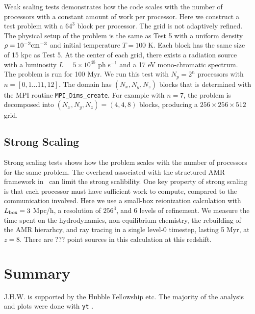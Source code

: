 \documentclass[12pt,preprint]{aastex}
\begin{document}
Weak scaling tests demonstrates how the code scales with the number of
processors with a constant amount of work per processor.  Here we
construct a test problem with a $64^3$ block per processor.  The grid
is not adaptively refined.  The physical setup of the problem is the
same as Test 5 with a uniform density $\rho = 10^{-3} \cubecm$ and
initial temperature $T = 100$ K.  Each block has the same size of 15
kpc as Test 5.  At the center of each grid, there exists a radiation
source with a luminosity $L = 5 \times 10^{48}$ ph s$^{-1}$ and a 17
eV mono-chromatic spectrum.  The problem is run for 100 Myr.  We run
this test with $N_p = 2^n$ processors with $n = [0,1 \dots 11,12]$.
The domain has $(N_x, N_y, N_z)$ blocks that is determined with the
MPI routine \texttt{MPI\_Dims\_create}.  For example with $n = 7$, the
problem is decomposed into $(N_x, N_y, N_z) = (4,4,8)$ blocks,
producing a $256 \times 256 \times 512$ grid.

\subsection{Strong Scaling}
\label{sec:strong_sc}

Strong scaling tests shows how the problem scales with the number of
processors for the same problem.  The overhead associated with the
structured AMR framework in \enzo~can limit the strong scalibility.
One key property of strong scaling is that each processor must have
sufficient work to compute, compared to the communication involved.
Here we use a small-box reionization calculation with $L_{\rm box} =
3$ Mpc/h, a resolution of $256^3$, and 6 levels of refinement.  We
measure the time spent on the hydrodynamics, non-equilibrium
chemistry, the rebuilding of the AMR hierarhcy, and ray tracing in a
single level-0 timestep, lasting 5 Myr, at $z=8$.  There are ??? point
sources in this calculation at this redshift.

\section{Summary}

\acknowledgments

J.H.W. is supported by the Hubble Fellowship etc.  The majority of the
analysis and plots were done with \texttt{yt} \citep{yt}.

\clearpage
%

\end{document}
